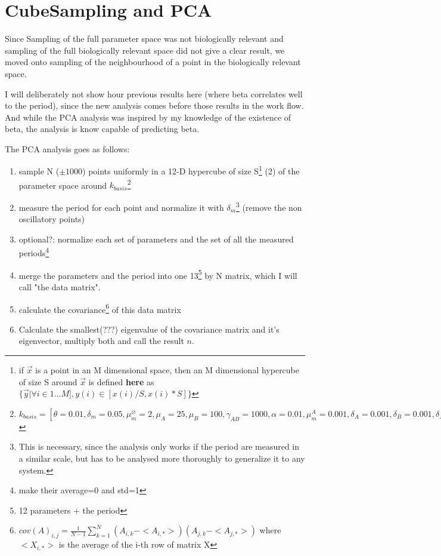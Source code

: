 \documentclass[12pt]{article}
\newcommand{\p}{\vspace{5 mm}\noindent}
\begin{document}
\section{CubeSampling and PCA}

\p Since Sampling of the full parameter space was not biologically relevant and sampling of the full biologically relevant space did not give a clear result, we moved onto sampling of the neighbourhood of a point in the biologically relevant space.

\p I will deliberately not show hour previous results here (where beta correlates well to the period), since the new analysis comes before those results in the work flow. And while the PCA analysis was inspired by my knowledge of the existence of beta, the analysis is know capable of predicting beta.

\newpage

\p The PCA analysis goes as follows:

\begin{enumerate}
\item sample N ($\pm 1000$) points uniformly in a 12-D hypercube of size S\footnote{if $\overrightarrow{x}$ is a point in an M dimensional space, then an M dimensional hypercube of size S around $\overrightarrow{x}$ is defined {\bf here} as $\{\overrightarrow{y}|\forall i \in 1...M], y(i) \in [x(i)/S,x(i)*S]\}$} (2) of the parameter space around $k_{basis}$\footnote{$k_{basis}=[\theta=0.01, \delta_m=0.05, \mu_m^\varnothing=2, \mu_A=25, \mu_B=100, \gamma_{A\! B}=1000, \alpha=0.01, \mu_m^A=0.001, \delta_A=0.001, \delta_B=0.001, \delta_{A\! B}=1, \lambda_{A\! B}=0.001]$}
\item measure the period for each point and normalize it with $\delta_m$\footnote{This is necessary, since the analysis only works if the period are measured in a similar scale, but has to be analysed more thoroughly to generalize it to any system.} (remove the non oscillatory points)
\item optional?: normalize each set of parameters and the set of all the measured periods\footnote{make their average=0 and std=1}
\item merge the parameters and the period into one 13\footnote{12 parameters + the period} by N matrix, which I will call "the data matrix".
\item calculate the covariance\footnote{$cov(A)_{i,j}=\frac{1}{N-1}\sum_{k=1}^N (A_{i,k}-<A_{i,*}>)(A_{j,k}-<A_{j,*}>)$ where $<X_{i,*}>$ is the average of the i-th row of matrix X} of this data matrix
\item Calculate the smallest(???) eigenvalue of the covariance matrix and it's eigenvector, multiply both and call the result $n$.
\end{enumerate}
\end{document}
